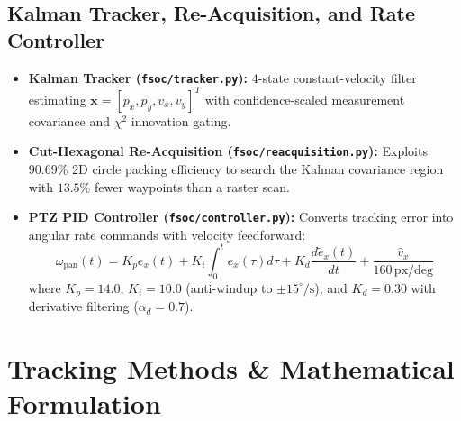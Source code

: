 \documentclass[11pt,a4paper]{article}
\begin{document}
\subsection{Kalman Tracker, Re-Acquisition, and Rate Controller}
\begin{itemize}[noitemsep,topsep=2pt]
    \item \textbf{Kalman Tracker (\texttt{fsoc/tracker.py}):} 4-state constant-velocity filter estimating $\mathbf{x} = [p_x, p_y, v_x, v_y]^T$ with confidence-scaled measurement covariance and $\chi^2$ innovation gating.
    \item \textbf{Cut-Hexagonal Re-Acquisition (\texttt{fsoc/reacquisition.py}):} Exploits $90.69\%$ 2D circle packing efficiency to search the Kalman covariance region with $13.5\%$ fewer waypoints than a raster scan.
    \item \textbf{PTZ PID Controller (\texttt{fsoc/controller.py}):} Converts tracking error into angular rate commands with velocity feedforward:
    \begin{equation}
        \omega_{\text{pan}}(t) = K_p e_x(t) + K_i \int_0^t e_x(\tau) d\tau + K_d \frac{d\tilde{e}_x(t)}{dt} + \frac{\hat{v}_x}{160\,\text{px/deg}}
    \end{equation}
    where $K_p = 14.0$, $K_i = 10.0$ (anti-windup to $\pm 15^\circ/\text{s}$), and $K_d = 0.30$ with derivative filtering ($\alpha_d = 0.7$).
\end{itemize}

\FloatBarrier

\section{Tracking Methods \& Mathematical Formulation}
\end{document}

